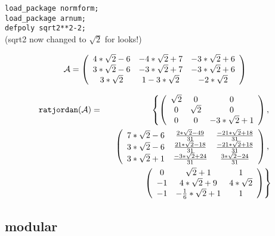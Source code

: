 {\tt load\_package normform;} \\
{\tt load\_package arnum;} \\
{\tt defpoly sqrt2**2-2;} \\
(sqrt2 now changed to ${\sqrt{2}}$ for looks!) 
\vspace{0.2in}

\begin{displaymath}
{\cal A} = \left( \begin{array}{ccc} 4*{\sqrt{2}}-6 & -4*{\sqrt{2}}+7 &
-3*{\sqrt{2}}+6 \\ 3*{\sqrt{2}}-6 & -3*{\sqrt{2}}+7 & -3*{\sqrt{2}}+6 
\\ 3*{\sqrt{2}} & 1-3*{\sqrt{2}} & -2*{\sqrt{2}}   \end{array} \right)
\end{displaymath} 
\vspace{0.2in}

\begin{eqnarray}
{\tt ratjordan}({\cal A}) & = & 
\left\{ \left( \begin{array}{ccc} {\sqrt{2}} & 0 & 0 \\ 0 & {\sqrt{2}} 
& 0 \\ 0 & 0 & -3*{\sqrt{2}}+1 \end{array} \right), \right. \nonumber 
\\ & & \hspace{0.1in} \left. \left( \begin{array}{ccc} 7*{\sqrt{2}}-6 
& \frac{2*{\sqrt{2}}-49}{31} & \frac{-21*{\sqrt{2}}+18}{31} \\ 
3*{\sqrt{2}}-6 & \frac{21*{\sqrt{2}}-18}{31} & \frac{-21*{\sqrt{2}}+18}
{31} \\ 3*{\sqrt{2}}+1 & \frac{-3*{\sqrt{2}}+24}{31} & 
\frac{3*{\sqrt{2}}-24}{31} \end{array} \right), \right. \nonumber \\ & 
& \hspace{0.1in} \left. \left( \begin{array}{ccc} 0 & {\sqrt{2}}+1 & 
1 \\ -1 & 4*{\sqrt{2}}+9 & 4*{\sqrt{2}} \\ -1 & -\frac{1}{6}*{\sqrt{2}}
+1 & 1 \end{array} \right) \right\} \nonumber 
\end{eqnarray}

\newpage


\subsection{modular}

